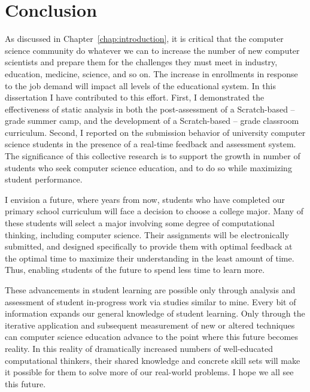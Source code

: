 \chapter{Conclusion} \label{chap:conclusion}

As discussed in Chapter~\ref{chap:introduction}, it is critical that the
computer science community do whatever we can to increase the number of new
computer scientists and prepare them for the challenges they must meet in
industry, education, medicine, science, and so on. The increase in enrollments
in response to the job demand will impact all levels of the educational
system. In this dissertation I have contributed to this effort. First, I
demonstrated the effectiveness of static analysis in both the post-assessment
of a Scratch-based -- grade summer camp, and the development of a
Scratch-based -- grade classroom curriculum. Second, I reported
on the submission behavior of university computer science students in the
presence of a real-time feedback and assessment system. The significance of
this collective research is to support the growth in number of students who
seek computer science education, and to do so while maximizing student
performance.

I envision a future, where years from now, students who have completed our
primary school curriculum will face a decision to choose a college major. Many
of these students will select a major involving some degree of computational
thinking, including computer science. Their assignments will be electronically
submitted, and designed specifically to provide them with optimal feedback at
the optimal time to maximize their understanding in the least amount of
time. Thus, enabling students of the future to spend less time to learn more.

These advancements in student learning are possible only through analysis and
assessment of student in-progress work via studies similar to mine. Every bit
of information expands our general knowledge of student learning. Only through
the iterative application and subsequent measurement of new or altered
techniques can computer science education advance to the point where this
future becomes reality. In this reality of dramatically increased numbers of
well-educated computational thinkers, their shared knowledge and concrete skill
sets will make it possible for them to solve more of our real-world problems. I
hope we all see this future.
